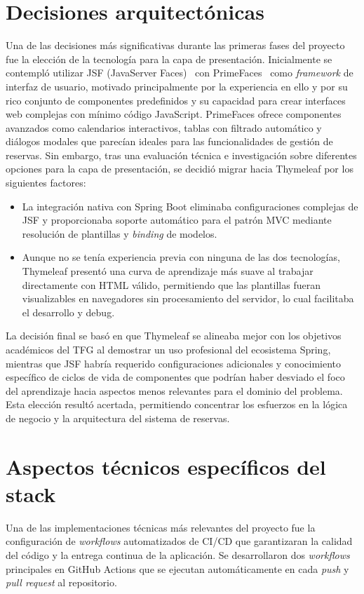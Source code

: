 \section{Decisiones arquitectónicas}\label{decisiones-arquitectonicas}
Una de las decisiones más significativas durante las primeras fases del proyecto fue la elección de la tecnología para la capa de presentación. Inicialmente se contempló utilizar JSF (JavaServer Faces)~\cite{jsf} con PrimeFaces~\cite{primefaces} como \emph{framework} de interfaz de usuario, motivado principalmente por la experiencia en ello y por su rico conjunto de componentes predefinidos y su capacidad para crear interfaces web complejas con mínimo código JavaScript. PrimeFaces ofrece componentes avanzados como calendarios interactivos, tablas con filtrado automático y diálogos modales que parecían ideales para las funcionalidades de gestión de reservas.
Sin embargo, tras una evaluación técnica e investigación sobre diferentes opciones para la capa de presentación, se decidió migrar hacia Thymeleaf por los siguientes factores:

\begin{itemize}
\tightlist
\item
La integración nativa con Spring Boot eliminaba configuraciones complejas de JSF y proporcionaba soporte automático para el patrón MVC mediante resolución de plantillas y \emph{binding} de modelos.
\item
Aunque no se tenía experiencia previa con ninguna de las dos tecnologías, Thymeleaf presentó una curva de aprendizaje más suave al trabajar directamente con HTML válido, permitiendo que las plantillas fueran visualizables en navegadores sin procesamiento del servidor, lo cual facilitaba el desarrollo y debug.
\end{itemize}

La decisión final se basó en que Thymeleaf se alineaba mejor con los objetivos académicos del TFG al demostrar un uso profesional del ecosistema Spring, mientras que JSF habría requerido configuraciones adicionales y conocimiento específico de ciclos de vida de componentes que podrían haber desviado el foco del aprendizaje hacia aspectos menos relevantes para el dominio del problema. Esta elección resultó acertada, permitiendo concentrar los esfuerzos en la lógica de negocio y la arquitectura del sistema de reservas.

\section{Aspectos técnicos específicos del stack}\label{aspectos-terncicos-del-stack}
Una de las implementaciones técnicas más relevantes del proyecto fue la configuración de \emph{workflows} automatizados de CI/CD que garantizaran la calidad del código y la entrega continua de la aplicación. Se desarrollaron dos \emph{workflows} principales en GitHub Actions que se ejecutan automáticamente en cada \emph{push} y \emph{pull request} al repositorio.

